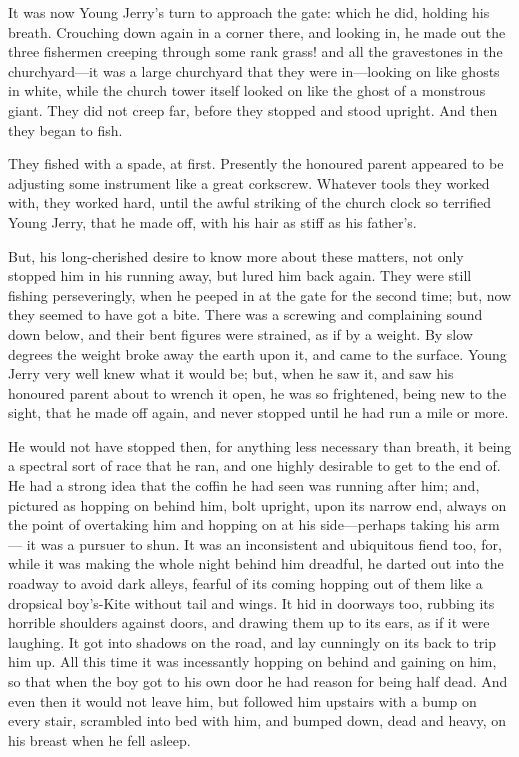 It was now Young Jerry's turn to approach the gate:  which he did,
holding his breath.  Crouching down again in a corner there, and looking
in, he made out the three fishermen creeping through some rank grass!
and all the gravestones in the churchyard---it was a large churchyard
that they were in---looking on like ghosts in white, while the church
tower itself looked on like the ghost of a monstrous giant.  They did
not creep far, before they stopped and stood upright.  And then they
began to fish.

They fished with a spade, at first.  Presently the honoured parent
appeared to be adjusting some instrument like a great corkscrew.
Whatever tools they worked with, they worked hard, until the awful
striking of the church clock so terrified Young Jerry, that he made off,
with his hair as stiff as his father's.

But, his long-cherished desire to know more about these matters, not
only stopped him in his running away, but lured him back again.  They
were still fishing perseveringly, when he peeped in at the gate for
the second time; but, now they seemed to have got a bite.  There was a
screwing and complaining sound down below, and their bent figures were
strained, as if by a weight.  By slow degrees the weight broke away the
earth upon it, and came to the surface.  Young Jerry very well knew what
it would be; but, when he saw it, and saw his honoured parent about to
wrench it open, he was so frightened, being new to the sight, that he
made off again, and never stopped until he had run a mile or more.

He would not have stopped then, for anything less necessary than
breath, it being a spectral sort of race that he ran, and one highly
desirable to get to the end of.  He had a strong idea that the coffin
he had seen was running after him; and, pictured as hopping on behind
him, bolt upright, upon its narrow end, always on the point of
overtaking him and hopping on at his side---perhaps taking his arm---%
it was a pursuer to shun.  It was an inconsistent and ubiquitous fiend
too, for, while it was making the whole night behind him dreadful,
he darted out into the roadway to avoid dark alleys, fearful of its
coming hopping out of them like a dropsical boy's-Kite without tail
and wings.  It hid in doorways too, rubbing its horrible shoulders
against doors, and drawing them up to its ears, as if it were laughing.
It got into shadows on the road, and lay cunningly on its back to
trip him up.  All this time it was incessantly hopping on behind and
gaining on him, so that when the boy got to his own door he had reason
for being half dead.  And even then it would not leave him, but followed
him upstairs with a bump on every stair, scrambled into bed with him,
and bumped down, dead and heavy, on his breast when he fell asleep.

